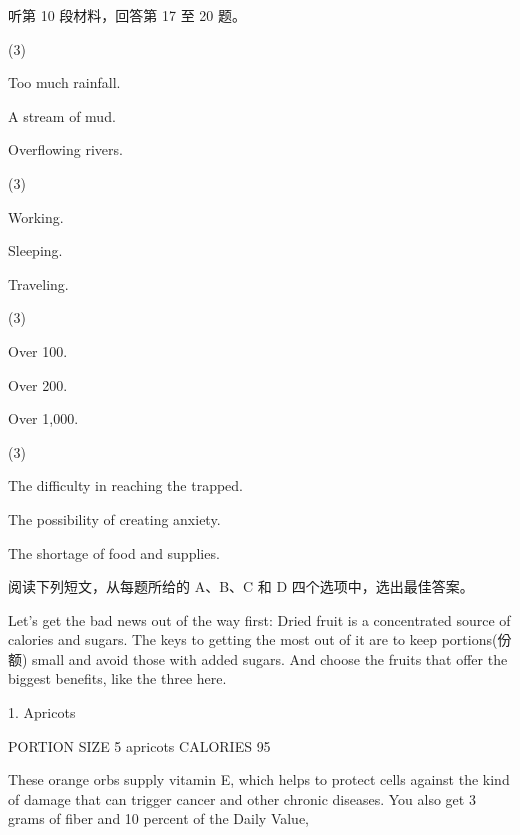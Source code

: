 \documentclass{英语试卷}
\begin{document}
\par 听第 10 段材料，回答第 17 至 20 题。\par
{}
\begin{choices}(3)
  \item Too much rainfall.
  \item A stream of mud.
  \item Overflowing rivers.
\end{choices}
\begin{choices}(3)
  \item Working.
  \item Sleeping.
  \item Traveling.
\end{choices}
\begin{choices}(3)
  \item Over 100.
  \item Over 200.
  \item Over 1,000.
\end{choices}
\begin{choices}(3)
  \item The difficulty in reaching the trapped.
  \item The possibility of creating anxiety.
  \item The shortage of food and supplies.
\end{choices}
\par 阅读下列短文，从每题所给的 A、B、C 和 D 四个选项中，选出最佳答案。\par
{}
\par Let's get the bad news out of the way first: Dried fruit is a concentrated source of calories and sugars. The keys to getting the most out of it are to keep portions(份额) small and avoid those with added sugars. And choose the fruits that offer the biggest benefits, like the three here.\par
\par 1. Apricots\par
\par PORTION SIZE 5 apricots CALORIES 95\par
\par These orange orbs supply vitamin E, which helps to protect cells against the kind of damage that can trigger cancer and other chronic diseases. You also get 3 grams of fiber and 10 percent of the Daily Value,\par
\end{document}
